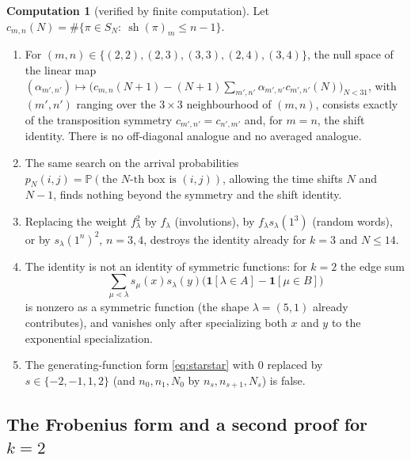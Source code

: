 \documentclass[11pt]{article}
\theoremstyle{definition}
\newtheorem{computation}[theorem]{Computation}
\theoremstyle{remark}
\newcommand{\Prob}{\mathbb{P}}
\DeclareMathOperator{\sh}{sh}
\begin{document}
\begin{computation}[verified by finite computation]\label{comp:rigid}
Let $c_{m,n}(N)=\#\{\pi\in S_N:\ \sh(\pi)_m\le n-1\}$.
\begin{enumerate}[label=(\roman*)]
\item For $(m,n)\in\{(2,2),(2,3),(3,3),(2,4),(3,4)\}$, the null space of the linear map $(\alpha_{m',n'})\mapsto\bigl(c_{m,n}(N+1)-(N+1)\sum_{m',n'}\alpha_{m',n'}c_{m',n'}(N)\bigr)_{N<31}$, with $(m',n')$ ranging over the $3\times3$ neighbourhood of $(m,n)$, consists exactly of the transposition symmetry $c_{m',n'}=c_{n',m'}$ and, for $m=n$, the shift identity. There is no off-diagonal analogue and no averaged analogue.
\item The same search on the arrival probabilities $p_N(i,j)=\Prob(\text{the $N$-th box is }(i,j))$, allowing the time shifts $N$ and $N-1$, finds nothing beyond the symmetry and the shift identity.
\item Replacing the weight $f_\lambda^2$ by $f_\lambda$ (involutions), by $f_\lambda s_\lambda(1^3)$ (random words), or by $s_\lambda(1^n)^2$, $n=3,4$, destroys the identity already for $k=3$ and $N\le14$.
\item The identity is not an identity of symmetric functions: for $k=2$ the edge sum
\[
\sum_{\mu\lessdot\lambda}s_\mu(x)s_\lambda(y)\bigl(\mathbf 1[\lambda\in A]-\mathbf 1[\mu\in B]\bigr)
\]
is nonzero as a symmetric function (the shape $\lambda=(5,1)$ already contributes), and vanishes only after specializing both $x$ and $y$ to the exponential specialization.
\item The generating-function form \eqref{eq:starstar} with $0$ replaced by $s\in\{-2,-1,1,2\}$ (and $n_0,n_1,N_0$ by $n_s,n_{s+1},N_s$) is false.
\end{enumerate}
\end{computation}

\subsection{The Frobenius form and a second proof for $k=2$}\label{sec:frobenius}
\end{document}
